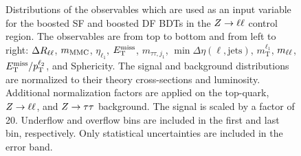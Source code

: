 \begin{figure}[htb]
\begin{subfigure}[t]{0.3\textwidth}
    \end{subfigure}
    \caption{Distributions of the observables which are used as an input variable for the boosted SF and boosted DF BDTs in the $Z \to \ell \ell$ control region.
             The observables are from top to bottom and from left to right: $\Delta R_{\ell\ell}$, $m_\text{MMC}$, $\eta_{\ell_1}$, $E_\text{T}^\text{miss}$, $m_{\tau\tau,j_{1}}$,
             $\min \Delta \eta (\ell, \text{jets})$, $m_\text{T}^{\ell_1}$, $m_{\ell\ell}$, $E_\text{T}^\text{miss} / p_\text{T}^{\ell_2}$, and Sphericity.
             The signal and background distributions are normalized to their theory cross-sections and luminosity.
             Additional normalization factors are applied on the top-quark, $Z \to \ell \ell$, and $Z \to \tau \tau$ background.
             The signal is scaled by a factor of 20.
             Underflow and overflow bins are included in the first and last bin, respectively.
             Only statistical uncertainties are included in the error band.}\label{fig:mva:modeling:cr:boostzll}
\end{figure}


